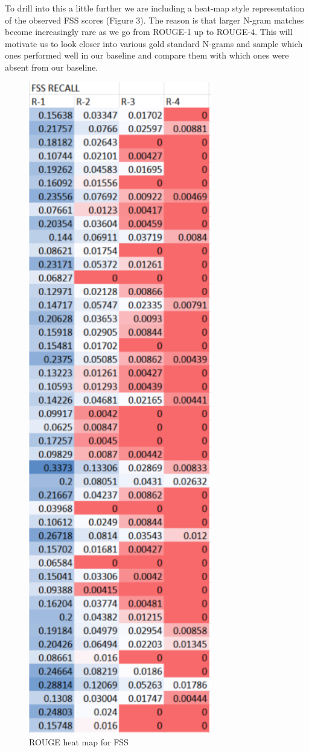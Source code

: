 \documentclass[11pt,a4paper]{article}
\begin{document}
To drill into this a little further we are including a heat-map style representation of the observed FSS scores (Figure 3). The reason is that larger N-gram matches become increasingly rare as we go from ROUGE-1 up to ROUGE-4. This will motivate us to look closer into various gold standard N-grams and sample which ones performed well in our baseline and compare them with which ones were absent from our baseline.

\begin{figure}
\caption{ROUGE heat map for FSS}
\includegraphics[width=80mm,scale=0.5]{rouge_heat_map.png}
\end{figure}
\end{document}

